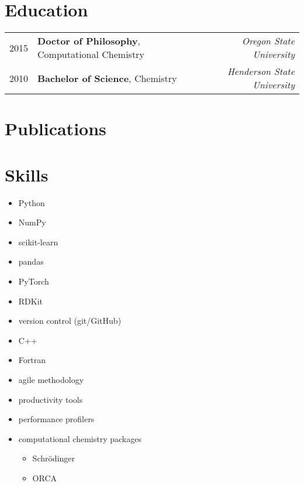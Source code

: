 \documentclass[a4paper,12pt]{article}
\begin{document}
\section{Education}

\begin{tabularx}{\textwidth} {l l r}   
    2015 & \textbf{Doctor of Philosophy}, Computational Chemistry & \textit{Oregon State University} \\
    2010 & \textbf{Bachelor of Science}, Chemistry & \textit{Henderson State University} \\
\end{tabularx}
\vspace{6pt}

\section{Publications}
\begin{refsection}
\nocite{*}
\printbibliography[heading=none]
\end{refsection}

\section{Skills}
\begin{multicols}{3}
    \begin{itemize}
        \item Python
        \item NumPy
        \item scikit-learn
        \item pandas
        \item PyTorch
        \item RDKit
        \item version control (git/GitHub)
        \item C++
        \item Fortran
        \item agile methodology
        \item productivity tools
        \item performance profilers
        \item computational chemistry packages
        \begin{itemize}
            \item Schr\"odinger
            \item ORCA
        \end{itemize}
    \end{itemize}
\end{multicols}
\end{document}
